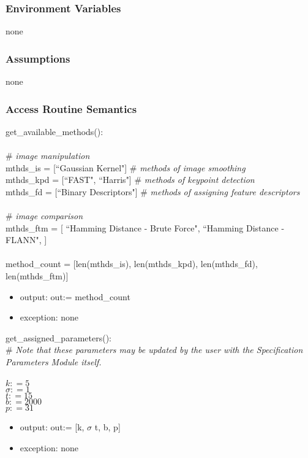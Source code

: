 \documentclass[12pt, titlepage]{article}
\begin{document}
\subsubsection{Environment Variables}
none 

\subsubsection{Assumptions}
none 

\subsubsection{Access Routine Semantics}


\noindent get\_available\_methods():\\ \\
\# \textit{image manipulation} \\
mthds\_is = [``Gaussian Kernel"]  \# \textit{methods of image smoothing} \\
mthds\_kpd = [``FAST", ``Harris"]  \# \textit{methods of keypoint detection} \\
mthds\_fd = [``Binary Descriptors"]  \# \textit{methods of assigning feature descriptors} \\ \\
\# \textit{image comparison} \\
mthds\_ftm = [
    ``Hamming Distance - Brute Force", ``Hamming Distance - FLANN",
]  \\ \\
method\_count = [len(mthds\_is), len(mthds\_kpd), len(mthds\_fd), len(mthds\_ftm)]
\begin{itemize}
\item output: out:= method\_count
\item exception: none  
\end{itemize}


\noindent get\_assigned\_parameters():\\
\# \textit{Note that these parameters may be updated by the user with the Specification Parameters Module itself.}\\ \\
$k: = 5$ \\
$\sigma: = 1$ \\
$t: = 15$ \\
$b: = 2000$ \\
$p: = 31$ 

\begin{itemize}
\item output: out:= [k, $\sigma$ t, b, p]
\item exception: none  
\end{itemize}
\end{document}
